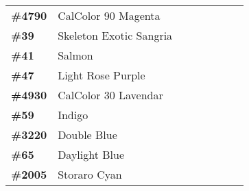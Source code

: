 \documentclass[../../Paper.tex]{subfiles}
\begin{document}
\begin{table}[!b]
\begin{tabular}{|l|l|llllll}
\textbf{\#4790}                                                              & CalColor 90 Magenta                                            & \textbf{}            & \textbf{} & \textbf{} & \textbf{}            & \textbf{} & \textbf{} \\ \cline{1-2}
\textbf{\#39}                                                                & Skeleton Exotic Sangria                                        &                      &           &           &                      &           &           \\ \cline{1-2}
\textbf{\#41}                                                                & Salmon                                                         &                      &           &           &                      &           &           \\ \cline{1-2}
\textbf{\#47}                                                                & Light Rose Purple                                              &                      &           &           &                      &           &           \\ \cline{1-2}
\textbf{\#4930}                                                              & CalColor 30 Lavendar                                           &                      &           &           &                      &           &           \\ \cline{1-2}
\textbf{\#59}                                                                & Indigo                                                         &                      &           &           &                      &           &           \\ \cline{1-2}
\textbf{\#3220}                                                              & Double Blue                                                    & \textbf{}            & \textbf{} & \textbf{} & \textbf{}            & \textbf{} & \textbf{} \\ \cline{1-2}
\textbf{\#65}                                                                & Daylight Blue                                                  &                      &           &           &                      &           &           \\ \cline{1-2}
\textbf{\#2005}                                                              & Storaro Cyan                                                   &                      &           &           &                      &           &           \\ \cline{1-2}

\end{tabular}
\end{table}
\end{document}
